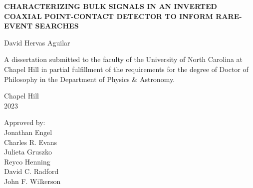 \begin{titlepage}
\begin{center}


\vspace{2in}
\begin{singlespace}
\bf
CHARACTERIZING BULK SIGNALS IN AN INVERTED COAXIAL POINT-CONTACT DETECTOR TO INFORM RARE-EVENT SEARCHES
\end{singlespace}


\vspace{61pt} %
\large David Hervas Aguilar
\end{center}



\vspace{50pt}
\begin{singlespace}
\begin{center}
\noindent \large
A dissertation submitted to the faculty of the University of North Carolina at Chapel Hill
in partial fulfillment of the requirements for the degree of Doctor of Philosophy in
the Department of Physics \& Astronomy.
\end{center}
\end{singlespace}


\vspace{50pt}
\begin{center}
\begin{singlespace} \large
Chapel Hill\\
2023
\end{singlespace}
\end{center}


\vfill
\begin{flushright}
\begin{minipage}[t]{1.5in} \large
Approved by:\\
Jonathan Engel \\
Charles R. Evans \\
Julieta Gruszko \\
Reyco Henning \\
David C. Radford \\
John F. Wilkerson
\end{minipage}
\end{flushright}

\end{titlepage}
